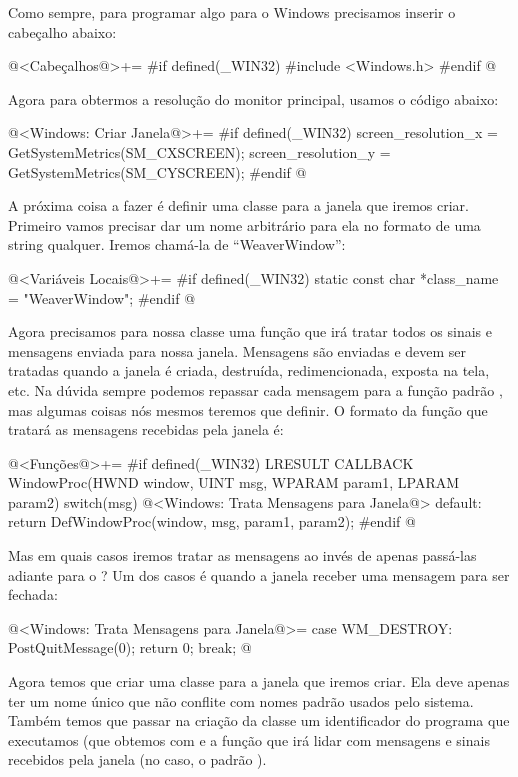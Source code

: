 
Como sempre, para programar algo para o Windows precisamos inserir o
cabeçalho abaixo:

\iniciocodigo
@<Cabeçalhos@>+=
#if defined(_WIN32)
#include <Windows.h>
#endif
@
\fimcodigo

Agora para obtermos a resolução do monitor principal, usamos o código
abaixo:

\iniciocodigo
@<Windows: Criar Janela@>+=
#if defined(_WIN32)
screen_resolution_x = GetSystemMetrics(SM_CXSCREEN);
screen_resolution_y = GetSystemMetrics(SM_CYSCREEN);
#endif
@
\fimcodigo

A próxima coisa a fazer é definir uma classe para a janela que iremos
criar. Primeiro vamos precisar dar um nome arbitrário para ela no
formato de uma string qualquer. Iremos chamá-la de ``WeaverWindow'':

\iniciocodigo
@<Variáveis Locais@>+=
#if defined(_WIN32)
static const char *class_name = "WeaverWindow";
#endif
@
\fimcodigo

Agora precisamos para nossa classe uma função que irá tratar todos os
sinais e mensagens enviada para nossa janela. Mensagens são enviadas e
devem ser tratadas quando a janela é criada, destruída,
redimencionada, exposta na tela, etc. Na dúvida sempre podemos
repassar cada mensagem para a função
padrão , mas algumas coisas nós mesmos
teremos que definir. O formato da função que tratará as mensagens
recebidas pela janela é:

\iniciocodigo
@<Funções@>+=
#if defined(_WIN32)
LRESULT CALLBACK WindowProc(HWND window, UINT msg, WPARAM param1, LPARAM param2){
  switch(msg){
    @<Windows: Trata Mensagens para Janela@>
    default:
      return DefWindowProc(window, msg, param1, param2);
  }
}
#endif
@
\fimcodigo

Mas em quais casos iremos tratar as mensagens ao invés de apenas
passá-las adiante para o ? Um dos casos é
quando a janela receber uma mensagem para ser fechada:

\iniciocodigo
@<Windows: Trata Mensagens para Janela@>=
case WM_DESTROY:
  PostQuitMessage(0);
  return 0;
  break;
@
\fimcodigo

Agora temos que criar uma classe para a janela que iremos criar. Ela
deve apenas ter um nome único que não conflite com nomes padrão usados
pelo sistema. Também temos que passar na criação da classe um
identificador do programa que executamos (que obtemos
com  e a função que irá lidar com
mensagens e sinais recebidos pela janela (no
caso, o padrão ).

